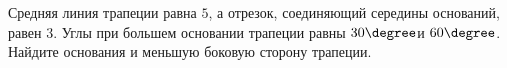 \begin{ex}
	\begin{condition}
		Средняя линия трапеции равна \( 5 \), а отрезок, соединяющий середины оснований, равен \( 3 \). Углы при большем основании трапеции равны \( 30\degree \)и \( 60\degree \). Найдите основания и меньшую боковую сторону трапеции.
	\end{condition}
\end{ex}